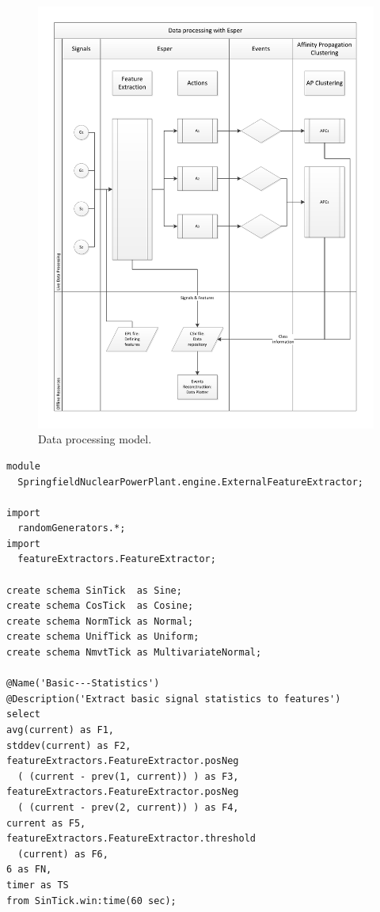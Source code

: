 \documentclass[11pt, letterpaper]{article}            %
\begin{document}
\begin{figure}[htbp]
	\centering
	\includegraphics[width=\textwidth]{./gfx/model.pdf}
  \caption{Data processing model.\label{fig:model}}
\end{figure}

\vspace{1em}
\begin{lstlisting}
module
  SpringfieldNuclearPowerPlant.engine.ExternalFeatureExtractor;

import
  randomGenerators.*;
import
  featureExtractors.FeatureExtractor;

create schema SinTick  as Sine;
create schema CosTick  as Cosine;
create schema NormTick as Normal;
create schema UnifTick as Uniform;
create schema NmvtTick as MultivariateNormal;

@Name('Basic---Statistics')
@Description('Extract basic signal statistics to features')
select
avg(current) as F1,
stddev(current) as F2,
featureExtractors.FeatureExtractor.posNeg
  ( (current - prev(1, current)) ) as F3,
featureExtractors.FeatureExtractor.posNeg
  ( (current - prev(2, current)) ) as F4,
current as F5,
featureExtractors.FeatureExtractor.threshold
  (current) as F6,
6 as FN,
timer as TS
from SinTick.win:time(60 sec);
\end{lstlisting}
\end{document}
